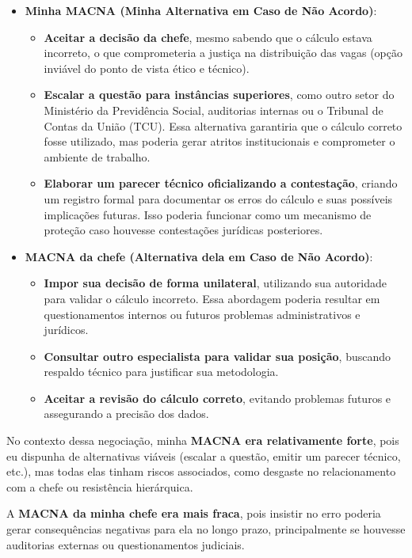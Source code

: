 \documentclass[11pt]{article}
\begin{document}
\begin{itemize}
\item \textbf{\textbf{Minha MACNA (Minha Alternativa em Caso de Não Acordo)}}:
\begin{itemize}
\item \textbf{Aceitar a decisão da chefe}, mesmo sabendo que o cálculo estava incorreto, o que comprometeria a justiça na distribuição das vagas (opção inviável do ponto de vista ético e técnico).
\item \textbf{Escalar a questão para instâncias superiores}, como outro setor do Ministério da Previdência Social, auditorias internas ou o Tribunal de Contas da União (TCU). Essa alternativa garantiria que o cálculo correto fosse utilizado, mas poderia gerar atritos institucionais e comprometer o ambiente de trabalho.
\item \textbf{Elaborar um parecer técnico oficializando a contestação}, criando um registro formal para documentar os erros do cálculo e suas possíveis implicações futuras. Isso poderia funcionar como um mecanismo de proteção caso houvesse contestações jurídicas posteriores.
\end{itemize}

\item \textbf{\textbf{MACNA da chefe (Alternativa dela em Caso de Não Acordo)}}:
\begin{itemize}
\item \textbf{Impor sua decisão de forma unilateral}, utilizando sua autoridade para validar o cálculo incorreto. Essa abordagem poderia resultar em questionamentos internos ou futuros problemas administrativos e jurídicos.
\item \textbf{Consultar outro especialista para validar sua posição}, buscando respaldo técnico para justificar sua metodologia.
\item \textbf{Aceitar a revisão do cálculo correto}, evitando problemas futuros e assegurando a precisão dos dados.
\end{itemize}
\end{itemize}

No contexto dessa negociação, minha \textbf{\textbf{MACNA era relativamente forte}}, pois eu dispunha de alternativas viáveis (escalar a questão, emitir um parecer técnico, etc.), mas todas elas tinham riscos associados, como desgaste no relacionamento com a chefe ou resistência hierárquica.

A \textbf{\textbf{MACNA da minha chefe era mais fraca}}, pois insistir no erro poderia gerar consequências negativas para ela no longo prazo, principalmente se houvesse auditorias externas ou questionamentos judiciais.
\end{document}
